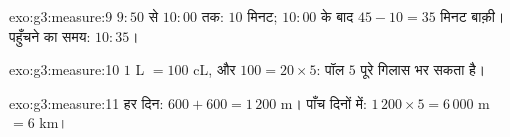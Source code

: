 \begin{solution}{exo:g3:measure:9}
$9{:}50$ से $10{:}00$ तक: $10$ मिनट; $10{:}00$ के बाद
$45 - 10 = 35$ मिनट बाक़ी। पहुँचने का समय: $10{:}35$।
\end{solution}

\begin{solution}{exo:g3:measure:10}
$1$ L $= 100$ cL, और $100 = 20 \times 5$: पॉल $5$ पूरे
गिलास भर सकता है।
\end{solution}

\begin{solution}{exo:g3:measure:11}
हर दिन: $600 + 600 = 1\,200$ m। पाँच दिनों में:
$1\,200 \times 5 = 6\,000$ m $= 6$ km।
\end{solution}
